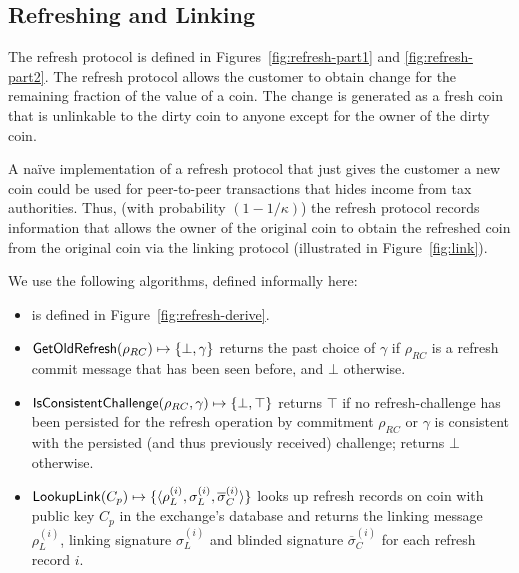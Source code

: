 \subsection{Refreshing and Linking}
The refresh protocol is defined in Figures~\ref{fig:refresh-part1} and
\ref{fig:refresh-part2}.  The refresh protocol allows the customer to
obtain change for the remaining fraction of the value of a coin.  The
change is generated as a fresh coin that is unlinkable to the dirty
coin to anyone except for the owner of the dirty coin.

A na\"ive implementation of a refresh protocol that just gives the customer a
new coin could be used for peer-to-peer transactions that hides income from tax
authorities.  Thus, (with probability $(1-1/\kappa)$) the refresh protocol
records information that allows the owner of the original coin to obtain the
refreshed coin from the original coin via the linking protocol (illustrated in
Figure~\ref{fig:link}).

We use the following algorithms, defined informally here:
\begin{itemize}
  \item {} is defined in Figure~\ref{fig:refresh-derive}.
  \item $\mathsf{GetOldRefresh}(\rho_{RC}) \mapsto \{\bot,\gamma\}$ returns the past
    choice of $\gamma$ if $\rho_{RC}$ is a refresh commit message that has been seen before,
    and $\bot$ otherwise.
  \item $\mathsf{IsConsistentChallenge}(\rho_{RC}, \gamma) \mapsto \{ \bot,\top \}$ returns
    $\top$ if no refresh-challenge has been persisted for the refresh operation by commitment
    $\rho_{RC}$ or $\gamma$ is consistent with the persisted (and thus previously received) challenge;
    returns $\bot$ otherwise.
  \item $\mathsf{LookupLink}(C_p) \mapsto \{ \langle \rho_{L}^{(i)}, \sigma_L^{(i)},
  \overline{\sigma}_C^{(i)} \rangle \}$ looks up refresh records on coin with public key $C_p$ in
    the exchange's database and returns the linking message $\rho_L^{(i)}$, linking
    signature $\sigma_L^{(i)}$ and blinded signature $\overline{\sigma}_C^{(i)}$ for each refresh
    record $i$.
\end{itemize}



